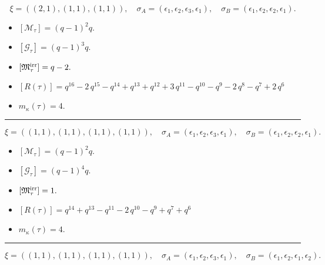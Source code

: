 \documentclass[10pt,a4paper]{amsart}
\begin{document}
$$\xi = ({(2, 1)}, {(1, 1)}, {(1, 1)}),\quad \sigma_A = ({{\epsilon_1, \epsilon_2}}, {{\epsilon_3}}, {{\epsilon_1}}),\quad \sigma_B = ({{\epsilon_1, \epsilon_2}}, {{\epsilon_2}}, {{\epsilon_1}}).$$

\begin{itemize}
 \item $[\mathcal{M}_{\tau}] = {\left(q - 1\right)}^{2} q .$

 \item $[\mathcal{G}_{\tau}] = {\left(q - 1\right)}^{3} q .$

 \item $[{\frak M}_{\tau}^{\textrm{irr}}] = q - 2 .$

 \item $[R(\tau)] = q^{16} - 2 \, q^{15} - q^{14} + q^{13} + q^{12} + 3 \, q^{11} - q^{10} - q^{9} - 2 \, q^{8} - q^{7} + 2 \, q^{6} $

 \item $m_{\kappa}(\tau) = 4 .$

 \end{itemize}
\noindent\rule{8cm}{0.4pt}

$$\xi = ({(1, 1), (1, 1)}, {(1, 1)}, {(1, 1)}),\quad \sigma_A = ({{\epsilon_1}, {\epsilon_2}}, {{\epsilon_3}}, {{\epsilon_1}}),\quad \sigma_B = ({{\epsilon_1}, {\epsilon_2}}, {{\epsilon_2}}, {{\epsilon_1}}).$$

\begin{itemize}
 \item $[\mathcal{M}_{\tau}] = {\left(q - 1\right)}^{2} q .$

 \item $[\mathcal{G}_{\tau}] = {\left(q - 1\right)}^{4} q .$

 \item $[{\frak M}_{\tau}^{\textrm{irr}}] = 1 .$

 \item $[R(\tau)] = q^{14} + q^{13} - q^{11} - 2 \, q^{10} - q^{9} + q^{7} + q^{6} $

 \item $m_{\kappa}(\tau) = 4 .$

 \end{itemize}
\noindent\rule{8cm}{0.4pt}

$$\xi = ({(1, 1), (1, 1)}, {(1, 1)}, {(1, 1)}),\quad \sigma_A = ({{\epsilon_1}, {\epsilon_2}}, {{\epsilon_3}}, {{\epsilon_1}}),\quad \sigma_B = ({{\epsilon_1}, {\epsilon_2}}, {{\epsilon_1}}, {{\epsilon_2}}).$$
\end{document}
